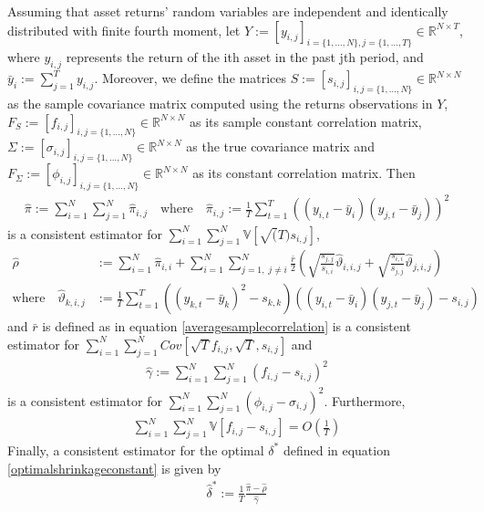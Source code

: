    	\begin{theorem}
    	    Assuming that asset returns' random variables are independent and identically distributed with finite fourth moment, let $Y := [y_{i,j}]_{i= \{1, \dots, N \}, j= \{1, \dots, T \}} \in \mathbb{R}^{N \times T}$, where $y_{i,j}$ represents the return of the ith asset in the past jth period, and $\bar{y}_i := \sum_{j=1}^T y_{i,j}$. Moreover, we define the matrices $S := [s_{i,j}]_{i,j= \{1, \dots, N \}} \in \mathbb{R}^{N \times N}$ as the sample covariance matrix computed using the returns observations in $Y$, $F_S := [f_{i,j}]_{i,j= \{1, \dots, N \}} \in \mathbb{R}^{N \times N}$ as its sample constant correlation matrix, $\Sigma := [\sigma_{i,j}]_{i,j= \{1, \dots, N \}} \in \mathbb{R}^{N \times N}$ as the true covariance matrix and $F_\Sigma := [\phi_{i,j}]_{i,j= \{1, \dots, N \}} \in \mathbb{R}^{N \times N}$ as its constant correlation matrix. Then
    	    \begin{align*}
    	        \hat{\pi} := \sum_{i=1}^N \sum_{j=1}^N \hat{\pi}_{i,j} \quad \text{where} \quad \hat{\pi}_{i,j} := \frac{1}{T} \sum_{t=1}^T \left( (y_{i,t} - \bar{y}_{i}) (y_{j,t} - \bar{y}_{j}) \right)^2
    	    \end{align*}
    	    is a consistent estimator for $\sum_{i=1}^N \sum_{j=1}^N \mathbb{V}[\sqrt(T) s_{i,j}]$,
    	    \begin{align*}
    	        \hat{\rho} &:= \sum_{i=1}^N \hat{\pi}_{i,i} + \sum_{i=1}^N \sum_{j=1, \; j \neq i}^N \frac{\bar{r}}{2} \left( \sqrt{\frac{s_{j,j}}{s_{i,i}}} \hat{\vartheta}_{i,i,j} + \sqrt{\frac{s_{i,i}}{s_{j,j}}} \hat{\vartheta}_{j,i,j} \right) \\
    	        \text{where} \quad \hat{\vartheta}_{k,i,j} &:= \frac{1}{T} \sum_{t=1}^T \left( (y_{k,t} - \bar{y}_k)^2 - s_{k,k} \right) \left( (y_{i,t} - \bar{y}_i) (y_{j,t} - \bar{y}_j) - s_{i,j} \right)
    	    \end{align*}
    	    and $\bar{r}$ is defined as in equation \ref{averagesamplecorrelation} is a consistent estimator for $\sum_{i=1}^N \sum_{j=1}^N Cov[\sqrt{T} f_{i,j}, \sqrt{T}, s_{i,j}]$ and
    	    \begin{align*}
    	        \hat{\gamma} := \sum_{i=1}^N \sum_{j=1}^N (f_{i,j} - s_{i,j})^2
    	    \end{align*}
    	    is a consistent estimator for $\sum_{i=1}^N \sum_{j=1}^N (\phi_{i,j} - \sigma_{i,j})^2$. Furthermore,
    	    \begin{align*}
    	        \sum_{i=1}^N \sum_{j=1}^N \mathbb{V}[f_{i,j} - s_{i,j}] = O \left( \frac{1}{T} \right)
    	    \end{align*}
    	    Finally, a consistent estimator for the optimal $\delta^*$ defined in equation \ref{optimalshrinkageconstant} is given by
    	    \begin{align}\label{consistentshrinkageconstantestimator}
    	        \hat{\delta}^* := \frac{1}{T} \frac{\hat{\pi} - \hat{\rho}}{\hat{\gamma}}
    	    \end{align}
    	\end{theorem}
    	
